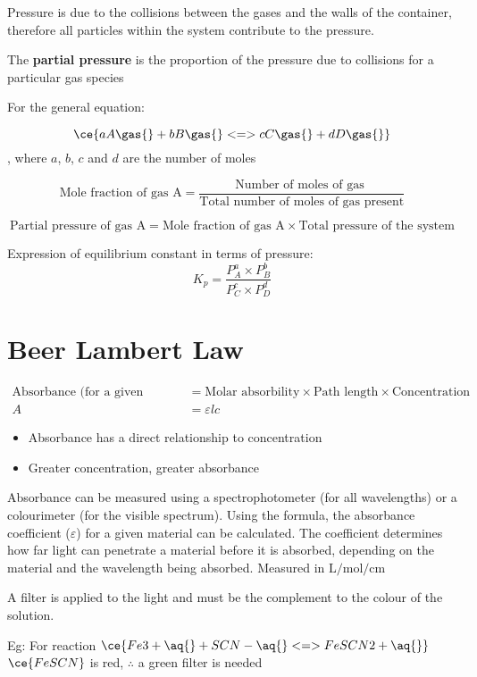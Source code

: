 		Pressure is due to the collisions between the gases and the walls of the container, therefore all particles within the system contribute to the pressure.

		The \textbf{partial pressure} is the proportion of the pressure due to collisions for a particular gas species

		For the general equation:

		$$\ce{aA \gas{} + bB \gas{} <=> cC \gas{} + dD \gas{}}$$, where $a$, $b$, $c$ and $d$ are the number of moles

		$$\text{Mole fraction of gas A} = \frac{\text{Number of moles of gas }}{\text{Total number of moles of gas present}}$$

		$$\text{Partial pressure of gas A} = \text{Mole fraction of gas A} \times \text{Total pressure of the system}$$

		Expression of equilibrium constant in terms of pressure:
		$$K_p = \frac{P^a_A \times P^b_B}{P^c_C \times P^d_D}$$

\section{Beer Lambert Law} \label{14/11/2024}
	\begin{align*}
		\text{Absorbance (for a given wavelength)} &= \text{Molar absorbility} \times \text{Path length} \times \text{Concentration} \\
		A &= \varepsilon lc
	\end{align*}
	\begin{itemize}
		\item Absorbance has a direct relationship to concentration
		\item Greater concentration, greater absorbance
	\end{itemize}

	Absorbance can be measured using a spectrophotometer (for all wavelengths) or a colourimeter (for the visible spectrum). Using the formula, the absorbance coefficient ($\varepsilon$) for a given material can be calculated. The coefficient determines how far light can penetrate a material before it is absorbed, depending on the material and the wavelength being absorbed. Measured in $\unit{\L\per\mole\per\cm}$

	A filter is applied to the light and must be the complement to the colour of the solution.

	Eg: For reaction $\ce{Fe3+ \aq{} + SCN- \aq{} <=> FeSCN2+ \aq{}}$
	$\ce{FeSCN}$ is red, $\therefore$ a green filter is needed

